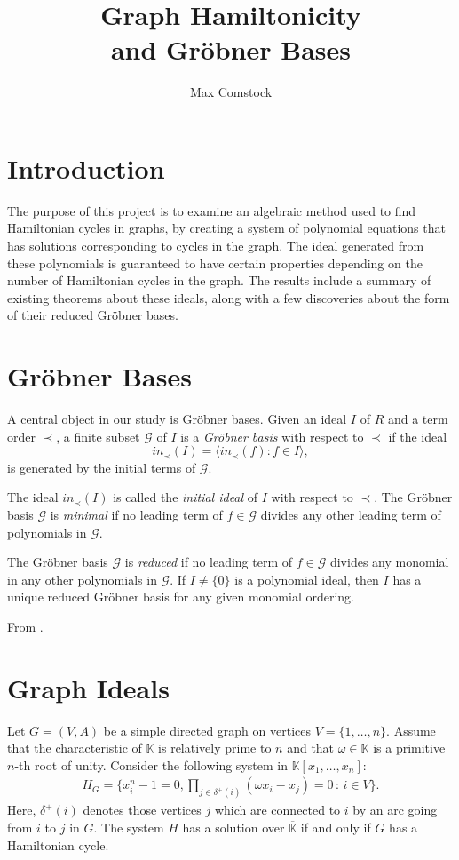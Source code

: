 \documentclass[thesis]{hmcposter}
\author{Max Comstock}
\title{Graph Hamiltonicity\\ and Gr\"obner Bases}
\renewcommand{\(}{\left(}
\renewcommand{\)}{\right)}
\newcommand{\<}{\langle}
\renewcommand{\>}{\rangle}
\renewcommand{\k}{\mathbb K}
\newcommand{\kc}{{\overline{\k}}}
\newcommand{\g}{\mathcal{G}}
\newcommand{\ideal}[1]{\langle #1 \rangle}
\begin{document}
\begin{poster}

\section{Introduction}

The purpose of this project is to examine an algebraic method used to find Hamiltonian cycles in graphs, by creating a system of polynomial equations that has solutions corresponding to cycles in the graph. The ideal generated from these polynomials is guaranteed to have certain properties depending on the number of Hamiltonian cycles in the graph. The results include a summary of existing theorems about these ideals, along with a few discoveries about the form of their reduced Gr\"obner bases.


\section{Gr\"obner Bases}

A central object in our study is Gr\"{o}bner bases.  Given an ideal $I$ of $R$ and a term order $\prec$, a finite subset $\g$ of $I$ is a \emph{Gr\"{o}bner basis} with respect to $\prec$ if the ideal
\[
in_{\prec}(I) = \ideal{in_{\prec}(f) : f \in I},
\]
is generated by the initial terms of $\g$.

The ideal $in_{\prec}(I)$ is called the \emph{initial ideal} of $I$ with respect to $\prec$.  The Gr\"{o}bner basis $\g$ is \emph{minimal} if no leading term of $f \in \g$ divides any other leading term of polynomials in $\g$.

The Gr\"obner basis $\g$ is \emph{reduced} if no leading term of $f \in \g$ divides any monomial in any other polynomials in $\g$. If $I \neq \{0\}$ is a polynomial ideal, then $I$ has a unique reduced Gr\"obner basis for any given monomial ordering.

From \cite{coxlittleoshea}.

\section{Graph Ideals}

Let $G = (V,A)$ be a simple directed graph on vertices $V = \{1, \ldots, n\}$. Assume that the characteristic of $\k$ is relatively prime to $n$ and that $\omega \in \k$ is a primitive $n$-th root of unity. Consider the following system in $\k[x_1, \ldots, x_n]$:
	\begin{align*}
		H_G = \{x_i^n - 1 = 0, \prod_{j \in \delta^+(i)} (\omega x_i - x_j) = 0 \, : \, i \in V\}.
	\end{align*}
Here, $\delta^+(i)$ denotes those vertices $j$ which are connected to $i$ by an arc going from $i$ to $j$ in $G$. The system $H$ has a solution over $\kc$ if and only if $G$ has a Hamiltonian cycle.


\end{poster}
\end{document}
